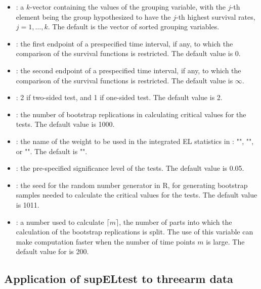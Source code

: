 \begin{itemize}
\item {}: a $k$-vector containing the values of the grouping variable, with the $j$-th element being the group hypothesized to have the $j$-th highest survival rates, $j=1,\ldots,k$. The default is the vector of sorted
grouping variables.
\item {}: the first endpoint of a prespecified time interval, if any, to which the comparison of the survival functions is restricted. The default value is 0.
\item {}: the second endpoint of a prespecified time interval, if any, to which the comparison of the survival functions is restricted. The default value is $\infty$.
\item {}: 2 if two-sided test, and 1 if one-sided test. The default value is 2.
\item {}: the number of bootstrap replications in calculating critical values for the tests. The default value is 1000.
\item {}: the name of the weight to be used in the integrated EL statistics in : "", "", or "". The default is "".
\item {}: the pre-specified significance level of the tests. The default value is 0.05.
\item {}: the seed for the random number generator in R, for generating bootstrap samples needed to calculate the critical values for the tests. The default value is 1011.
\item {}: a number used to calculate $\lceil m$$\rceil$, the number of parts into which the calculation of the  bootstrap replications is split.
The use of this variable can make computation faster when the number of time points $m$ is large. The default value for  is 200.
\end{itemize}


\subsection{Application of supELtest to threearm data}\label{sec:use_sup_simulated}

